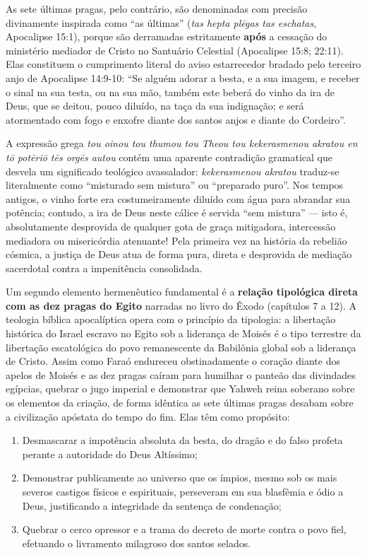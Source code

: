 \documentclass[11pt,a4paper,openany]{book}
\begin{document}
As sete últimas pragas, pelo contrário, são denominadas com precisão divinamente inspirada como ``as últimas'' (\textit{tas hepta plēgas tas eschatas}, Apocalipse 15:1), porque são derramadas estritamente \textbf{após} a cessação do ministério mediador de Cristo no Santuário Celestial (Apocalipse 15:8; 22:11). Elas constituem o cumprimento literal do aviso estarrecedor bradado pelo terceiro anjo de Apocalipse 14:9-10:
``Se alguém adorar a besta, e a sua imagem, e receber o sinal na sua testa, ou na sua mão, também este beberá do vinho da ira de Deus, que se deitou, pouco diluído, na taça da sua indignação; e será atormentado com fogo e enxofre diante dos santos anjos e diante do Cordeiro''.

A expressão grega \textit{tou oinou tou thumou tou Theou tou kekerasmenou akratou en tō potēriō tēs orgēs autou} contém uma aparente contradição gramatical que desvela um significado teológico avassalador: \textit{kekerasmenou akratou} traduz-se literalmente como ``misturado sem mistura'' ou ``preparado puro''. Nos tempos antigos, o vinho forte era costumeiramente diluído com água para abrandar sua potência; contudo, a ira de Deus neste cálice é servida ``sem mistura'' — isto é, absolutamente desprovida de qualquer gota de graça mitigadora, intercessão mediadora ou misericórdia atenuante! Pela primeira vez na história da rebelião cósmica, a justiça de Deus atua de forma pura, direta e desprovida de mediação sacerdotal contra a impenitência consolidada.

Um segundo elemento hermenêutico fundamental é a \textbf{relação tipológica direta com as dez pragas do Egito} narradas no livro do Êxodo (capítulos 7 a 12). A teologia bíblica apocalíptica opera com o princípio da tipologia: a libertação histórica do Israel escravo no Egito sob a liderança de Moisés é o tipo terrestre da libertação escatológica do povo remanescente da Babilônia global sob a liderança de Cristo.
Assim como Faraó endureceu obstinadamente o coração diante dos apelos de Moisés e as dez pragas caíram para humilhar o panteão das divindades egípcias, quebrar o jugo imperial e demonstrar que Yahweh reina soberano sobre os elementos da criação, de forma idêntica as sete últimas pragas desabam sobre a civilização apóstata do tempo do fim. Elas têm como propósito:
\begin{enumerate}
  \item Desmascarar a impotência absoluta da besta, do dragão e do falso profeta perante a autoridade do Deus Altíssimo;
  \item Demonstrar publicamente ao universo que os ímpios, mesmo sob os mais severos castigos físicos e espirituais, perseveram em sua blasfêmia e ódio a Deus, justificando a integridade da sentença de condenação;
  \item Quebrar o cerco opressor e a trama do decreto de morte contra o povo fiel, efetuando o livramento milagroso dos santos selados.
\end{enumerate}
\end{document}
